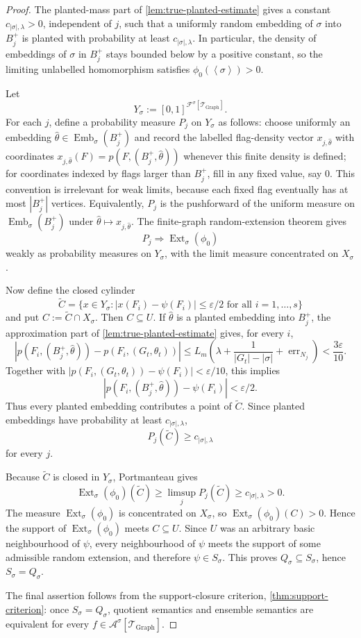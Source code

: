 \documentclass[11pt]{article}
\theoremstyle{definition}
\newcommand{\A}{\mathcal{A}}
\newcommand{\F}{\mathcal{F}}
\newcommand{\T}{\mathcal{T}}
\newcommand{\Emb}{\operatorname{Emb}}
\newcommand{\Ext}{\operatorname{Ext}}
\newcommand{\brak}[1]{\left\langle #1\right\rangle}
\newcommand{\eps}{\varepsilon}
\begin{document}
\begin{proof}
The planted-mass part of \cref{lem:true-planted-estimate} gives a constant
$c_{|\sigma|,\lambda}>0$, independent of $j$, such that a uniformly random
embedding of $\sigma$ into $B_j^+$ is planted with probability at least
$c_{|\sigma|,\lambda}$.  In particular, the density of embeddings of
$\sigma$ in $B_j^+$ stays bounded below by a positive constant, so the limiting
unlabelled homomorphism satisfies $\phi_0(\brak\sigma)>0$.

Let
\[
  Y_\sigma:=[0,1]^{\F^\sigma[\T_{\mathrm{Graph}}]}.
\]
For each $j$, define a probability measure $P_j$ on $Y_\sigma$ as follows:
choose uniformly an embedding
$\widehat\theta\in\Emb_\sigma(B_j^+)$ and record the labelled flag-density vector
$x_{j,\widehat\theta}$ with coordinates
$x_{j,\widehat\theta}(F)=p(F,(B_j^+,\widehat\theta))$ whenever this finite
density is defined; for coordinates indexed by flags larger than $B_j^+$, fill
in any fixed value, say $0$.  This convention is irrelevant for weak limits,
because each fixed flag eventually has at most $|B_j^+|$ vertices.
Equivalently, $P_j$ is the pushforward of the uniform measure on
$\Emb_\sigma(B_j^+)$ under
$\widehat\theta\mapsto x_{j,\widehat\theta}$.  The finite-graph random-extension
theorem gives
\[
  P_j \Rightarrow \Ext_\sigma(\phi_0)
\]
weakly as probability measures on $Y_\sigma$, with the limit measure
concentrated on $X_\sigma$.

Now define the closed cylinder
\[
  \widetilde C=
  \{x\in Y_\sigma:
    |x(F_i)-\psi(F_i)|\le\eps/2\text{ for all }i=1,\ldots,s\}
\]
and put $C:=\widetilde C\cap X_\sigma$.  Then $C\subseteq U$.  If
$\widehat\theta$ is a planted embedding into $B_j^+$, the approximation part of
\cref{lem:true-planted-estimate} gives, for every $i$,
\[
  |p(F_i,(B_j^+,\widehat\theta))-p(F_i,(G_t,\theta_t))|
  \le
  L_m\left(\lambda+\frac1{|G_t|-|\sigma|}
      +\operatorname{err}_{N_j}\right)
  < \frac{3\eps}{10}.
\]
Together with
$|p(F_i,(G_t,\theta_t))-\psi(F_i)|<\eps/10$, this implies
\[
  |p(F_i,(B_j^+,\widehat\theta))-\psi(F_i)|<\eps/2 .
\]
Thus every planted embedding contributes a point of $\widetilde C$.  Since
planted embeddings have probability at least $c_{|\sigma|,\lambda}$,
\[
  P_j(\widetilde C)\ge c_{|\sigma|,\lambda}
\]
for every $j$.

Because $\widetilde C$ is closed in $Y_\sigma$, Portmanteau gives
\[
  \Ext_\sigma(\phi_0)(\widetilde C)
  \ge
  \limsup_j P_j(\widetilde C)
  \ge
  c_{|\sigma|,\lambda}>0 .
\]
The measure $\Ext_\sigma(\phi_0)$ is concentrated on $X_\sigma$, so
$\Ext_\sigma(\phi_0)(C)>0$.  Hence the support of
$\Ext_\sigma(\phi_0)$ meets $C\subseteq U$.  Since $U$ was an arbitrary basic
neighbourhood of $\psi$, every neighbourhood of $\psi$ meets the support of some
admissible random extension, and therefore $\psi\in S_\sigma$.  This proves
$Q_\sigma\subseteq S_\sigma$, hence $S_\sigma=Q_\sigma$.

The final assertion follows from the support-closure criterion,
\cref{thm:support-criterion}: once $S_\sigma=Q_\sigma$, quotient semantics and
ensemble semantics are equivalent for every
$f\in\A^\sigma[\T_{\mathrm{Graph}}]$.
\end{proof}
\end{document}
